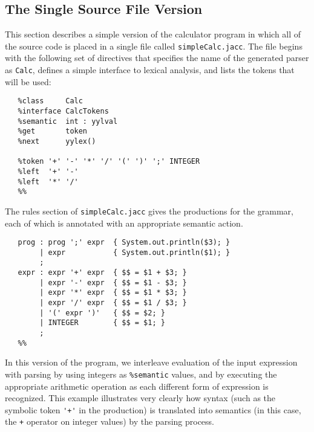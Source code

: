 \documentclass[12pt]{article}
\begin{document}
\subsection{The Single Source File Version}\label{sec-example-simple}
This section describes a simple version of the calculator
program in which all of the source code is placed in a single
file called \verb"simpleCalc.jacc".  The file begins with the following
set of directives that specifies the name of the generated parser
as \verb"Calc", defines a simple interface to lexical analysis,
and lists the tokens that will be used:
{\small
\begin{verbatim}
   %class     Calc
   %interface CalcTokens
   %semantic  int : yylval
   %get       token
   %next      yylex()

   %token '+' '-' '*' '/' '(' ')' ';' INTEGER
   %left  '+' '-'
   %left  '*' '/'
   %%
\end{verbatim}
}%
The rules section of \verb"simpleCalc.jacc" gives the productions for the
grammar, each of which is annotated with an appropriate semantic
action.
{\small
\begin{verbatim}
   prog : prog ';' expr  { System.out.println($3); }
        | expr           { System.out.println($1); }
        ;
   expr : expr '+' expr	 { $$ = $1 + $3; }
        | expr '-' expr	 { $$ = $1 - $3; }
        | expr '*' expr	 { $$ = $1 * $3; }
        | expr '/' expr	 { $$ = $1 / $3; }
        | '(' expr ')'   { $$ = $2; }
        | INTEGER        { $$ = $1; }
        ;
   %%
\end{verbatim}
}%
In this version of the program, we interleave evaluation of the
input expression with parsing by using integers as \verb"%semantic"
values, and by executing the appropriate arithmetic operation as
each different form of expression is recognized.  This example
illustrates very clearly how syntax (such as the symbolic token
\verb"'+'" in the production) is translated into semantics
(in this case, the \verb"+" operator on integer values) by the
parsing process.
\end{document}
